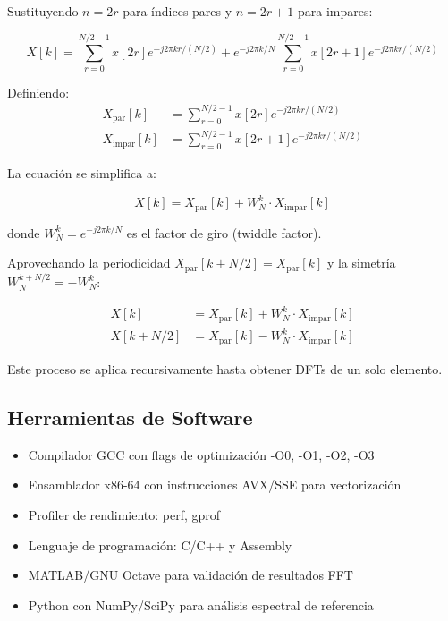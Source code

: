 \documentclass[a4paper]{article}
\begin{document}
Sustituyendo $n = 2r$ para índices pares y $n = 2r+1$ para impares:

\begin{equation}
X[k] = \sum_{r=0}^{N/2-1} x[2r] e^{-j2\pi kr/(N/2)} + e^{-j2\pi k/N} \sum_{r=0}^{N/2-1} x[2r+1] e^{-j2\pi kr/(N/2)}
\end{equation}

Definiendo:
\begin{align}
X_{\text{par}}[k] &= \sum_{r=0}^{N/2-1} x[2r] e^{-j2\pi kr/(N/2)} \\
X_{\text{impar}}[k] &= \sum_{r=0}^{N/2-1} x[2r+1] e^{-j2\pi kr/(N/2)}
\end{align}

La ecuación se simplifica a:

\begin{equation}
X[k] = X_{\text{par}}[k] + W_N^k \cdot X_{\text{impar}}[k]
\end{equation}

donde $W_N^k = e^{-j2\pi k/N}$ es el factor de giro (twiddle factor).

Aprovechando la periodicidad $X_{\text{par}}[k + N/2] = X_{\text{par}}[k]$ y la simetría $W_N^{k+N/2} = -W_N^k$:

\begin{align}
X[k] &= X_{\text{par}}[k] + W_N^k \cdot X_{\text{impar}}[k] \\
X[k + N/2] &= X_{\text{par}}[k] - W_N^k \cdot X_{\text{impar}}[k]
\end{align}

Este proceso se aplica recursivamente hasta obtener DFTs de un solo elemento.

\subsection{Herramientas de Software}
\begin{itemize}
\item Compilador GCC con flags de optimización -O0, -O1, -O2, -O3
\item Ensamblador x86-64 con instrucciones AVX/SSE para vectorización
\item Profiler de rendimiento: perf, gprof
\item Lenguaje de programación: C/C++ y Assembly
\item MATLAB/GNU Octave para validación de resultados FFT
\item Python con NumPy/SciPy para análisis espectral de referencia
\end{itemize}
\end{document}
